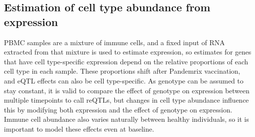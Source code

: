 \subsection{Estimation of cell type abundance from expression}
\label{subsec:hird_reQTL_xCell}

\Gls{PBMC} samples are a mixture of immune cells, and a fixed input of RNA extracted from that mixture is used to estimate expression, 
so estimates for genes that have cell type-specific expression depend on the relative proportions of each cell type in each sample.
These proportions shift after Pandemrix vaccination\autocite{sobolev2016AdjuvantedInfluenzaH1N1Vaccination},
and \gls{eQTL} effects can also be cell type-specific.
As genotype can be assumed to stay constant, it is valid to compare the effect of genotype on expression between multiple timepoints to call \glspl{reQTL}, 
but changes in cell type abundance influence this by modifying both expression and the effect of genotype on expression.
Immune cell abundance also varies naturally between healthy individuals\autocite{brodin2015VariationHumanImmune,brodin2017HumanImmuneSystem}, so it is important to model these effects even at baseline.

